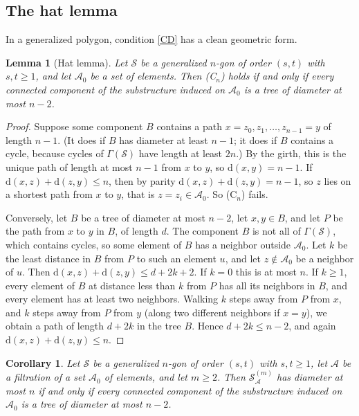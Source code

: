\documentclass[11pt]{amsart}
\newtheorem{lemma}[theorem]{Lemma}
\newtheorem{corollary}[theorem]{Corollary}
\theoremstyle{definition}
\theoremstyle{remark}
\newcommand{\cS}{\mathcal{S}}
\newcommand{\cA}{\mathcal{A}}
\newcommand{\dd}{\mathrm{d}}
\newcommand{\Dbl}[2]{{#1}^{(#2)}_{\cA}}
\begin{document}
\subsection{The hat lemma}
In a generalized polygon, condition \ref{CD} has a clean geometric form.

\begin{lemma}[Hat lemma]\label{lem:hat}
Let $\cS$ be a generalized $n$-gon of order $(s,t)$ with $s,t\ge1$, and let $\cA_0$ be a set of elements. Then \textup{(C$_n$)} holds if and only if every connected component of the substructure induced on $\cA_0$ is a tree of diameter at most $n-2$.
\end{lemma}

\begin{proof}
Suppose some component $B$ contains a path $x=z_0,z_1,\dots,z_{n-1}=y$ of length $n-1$. (It does if $B$ has diameter at least $n-1$; it does if $B$ contains a cycle, because cycles of $\Gamma(\cS)$ have length at least $2n$.) By the girth, this is the unique path of length at most $n-1$ from $x$ to $y$, so $\dd(x,y)=n-1$. If $\dd(x,z)+\dd(z,y)\le n$, then by parity $\dd(x,z)+\dd(z,y)=n-1$, so $z$ lies on a shortest path from $x$ to $y$, that is $z=z_i\in\cA_0$. So \textup{(C$_n$)} fails.

Conversely, let $B$ be a tree of diameter at most $n-2$, let $x,y\in B$, and let $P$ be the path from $x$ to $y$ in $B$, of length $d$. The component $B$ is not all of $\Gamma(\cS)$, which contains cycles, so some element of $B$ has a neighbor outside $\cA_0$. Let $k$ be the least distance in $B$ from $P$ to such an element $u$, and let $z\notin\cA_0$ be a neighbor of $u$. Then $\dd(x,z)+\dd(z,y)\le d+2k+2$. If $k=0$ this is at most $n$. If $k\ge1$, every element of $B$ at distance less than $k$ from $P$ has all its neighbors in $B$, and every element has at least two neighbors. Walking $k$ steps away from $P$ from $x$, and $k$ steps away from $P$ from $y$ (along two different neighbors if $x=y$), we obtain a path of length $d+2k$ in the tree $B$. Hence $d+2k\le n-2$, and again $\dd(x,z)+\dd(z,y)\le n$.
\end{proof}

\begin{corollary}\label{cor:hatiff}
Let $\cS$ be a generalized $n$-gon of order $(s,t)$ with $s,t\ge1$, let $\cA$ be a filtration of a set $\cA_0$ of elements, and let $m\ge2$. Then $\Dbl{\cS}{m}$ has diameter at most $n$ if and only if every connected component of the substructure induced on $\cA_0$ is a tree of diameter at most $n-2$.
\end{corollary}
\end{document}
